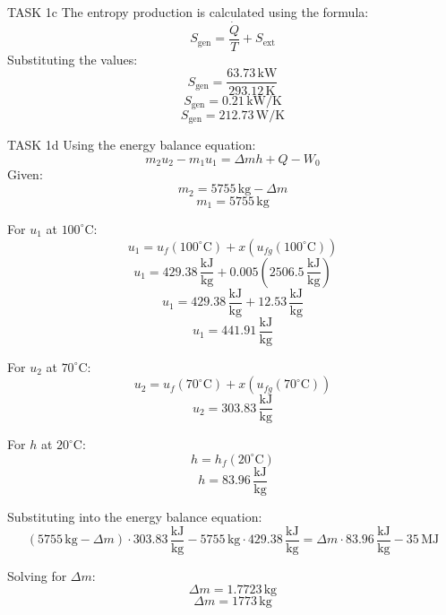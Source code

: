 TASK 1c  
The entropy production is calculated using the formula:  
\[
S_{\text{gen}} = \frac{\dot{Q}}{T} + S_{\text{ext}}
\]  
Substituting the values:  
\[
S_{\text{gen}} = \frac{63.73 \, \text{kW}}{293.12 \, \text{K}}
\]  
\[
S_{\text{gen}} = 0.21 \, \text{kW/K}
\]  
\[
S_{\text{gen}} = 212.73 \, \text{W/K}
\]  

TASK 1d  
Using the energy balance equation:  
\[
m_2 u_2 - m_1 u_1 = \Delta m h + Q - W_0
\]  
Given:  
\[
m_2 = 5755 \, \text{kg} - \Delta m
\]  
\[
m_1 = 5755 \, \text{kg}
\]  

For \( u_1 \) at \( 100^\circ\text{C} \):  
\[
u_1 = u_f(100^\circ\text{C}) + x(u_{fg}(100^\circ\text{C}))
\]  
\[
u_1 = 429.38 \, \frac{\text{kJ}}{\text{kg}} + 0.005 \left(2506.5 \, \frac{\text{kJ}}{\text{kg}}\right)
\]  
\[
u_1 = 429.38 \, \frac{\text{kJ}}{\text{kg}} + 12.53 \, \frac{\text{kJ}}{\text{kg}}
\]  
\[
u_1 = 441.91 \, \frac{\text{kJ}}{\text{kg}}
\]  

For \( u_2 \) at \( 70^\circ\text{C} \):  
\[
u_2 = u_f(70^\circ\text{C}) + x(u_{fg}(70^\circ\text{C}))
\]  
\[
u_2 = 303.83 \, \frac{\text{kJ}}{\text{kg}}
\]  

For \( h \) at \( 20^\circ\text{C} \):  
\[
h = h_f(20^\circ\text{C})
\]  
\[
h = 83.96 \, \frac{\text{kJ}}{\text{kg}}
\]  

Substituting into the energy balance equation:  
\[
(5755 \, \text{kg} - \Delta m) \cdot 303.83 \, \frac{\text{kJ}}{\text{kg}} - 5755 \, \text{kg} \cdot 429.38 \, \frac{\text{kJ}}{\text{kg}} = \Delta m \cdot 83.96 \, \frac{\text{kJ}}{\text{kg}} - 35 \, \text{MJ}
\]  

Solving for \( \Delta m \):  
\[
\Delta m = 1.7723 \, \text{kg}
\]  
\[
\Delta m = 1773 \, \text{kg}
\]